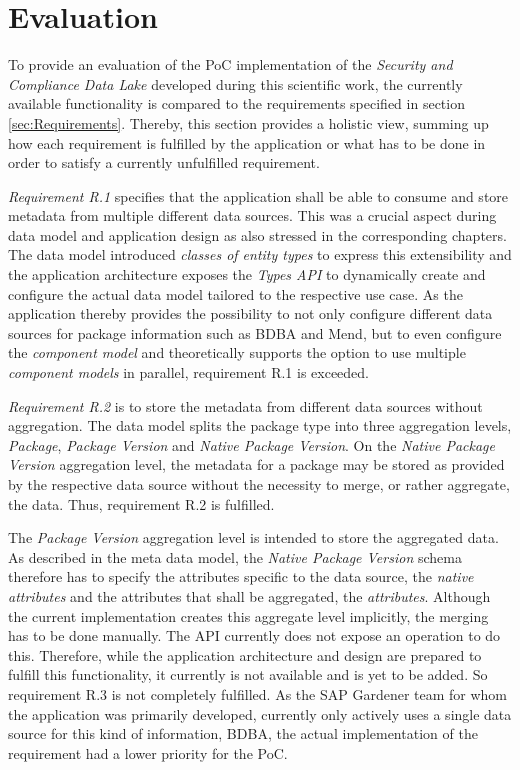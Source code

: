 \section{Evaluation}
To provide an evaluation of the PoC implementation of the \emph{Security and Compliance Data Lake} developed during this scientific work, the currently available functionality is compared to the requirements specified in section \ref{sec:Requirements}. Thereby, this section provides a holistic view, summing up how each requirement is fulfilled by the application or what has to be done in order to satisfy a currently unfulfilled requirement.\par
\emph{Requirement R.1} specifies that the application shall be able to consume and store metadata from multiple different data sources. This was a crucial aspect during data model and application design as also stressed in the corresponding chapters. The data model introduced \emph{classes of entity types} to express this extensibility and the application architecture exposes the \emph{Types API} to dynamically create and configure the actual data model tailored to the respective use case. As the application thereby provides the possibility to not only configure different data sources for package information such as BDBA and Mend, but to even configure the \emph{component model} and theoretically supports the option to use multiple \emph{component models} in parallel, requirement R.1 is exceeded.\par
\emph{Requirement R.2} is to store the metadata from different data sources without aggregation. The data model splits the package type into three aggregation levels, \emph{Package}, \emph{Package Version} and \emph{Native Package Version}. On the \emph{Native Package Version} aggregation level, the metadata for a package may be stored as provided by the respective data source without the necessity to merge, or rather aggregate, the data. Thus, requirement R.2 is fulfilled.\par
The \emph{Package Version} aggregation level is intended to store the aggregated data. As described in the meta data model, the \emph{Native Package Version} schema therefore has to specify the attributes specific to the data source, the \emph{native attributes} and the attributes that shall be aggregated, the \emph{attributes}. Although the current implementation creates this aggregate level implicitly, the merging has to be done manually. The API currently does not expose an operation to do this. Therefore, while the application architecture and design are prepared to fulfill this functionality, it currently is not available and is yet to be added. So requirement R.3 is not completely fulfilled. As the SAP Gardener team for whom the application was primarily developed, currently only actively uses a single data source for this kind of information, BDBA, the actual implementation of the requirement had a lower priority for the PoC.\par
